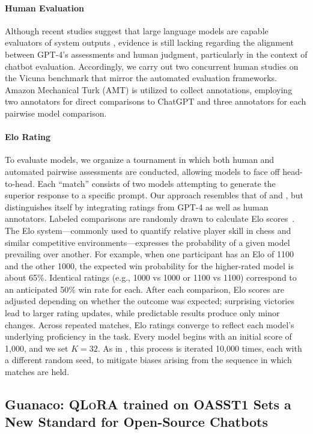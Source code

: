 \paragraph{Human Evaluation} Although recent studies suggest that large language models are capable evaluators of system outputs \citep{fu2023gptscore}, evidence is still lacking regarding the alignment between GPT-4’s assessments and human judgment, particularly in the context of chatbot evaluation. Accordingly, we carry out two concurrent human studies on the Vicuna benchmark that mirror the automated evaluation frameworks. Amazon Mechanical Turk (AMT) is utilized to collect annotations, employing two annotators for direct comparisons to ChatGPT and three annotators for each pairwise model comparison.

\paragraph{Elo Rating} To evaluate models, we organize a tournament in which both human and automated pairwise assessments are conducted, allowing models to face off head-to-head. Each “match” consists of two models attempting to generate the superior response to a specific prompt. Our approach resembles that of \citet{bai2022training} and \citet{vicuna2023}, but distinguishes itself by integrating ratings from GPT-4 as well as human annotators. Labeled comparisons are randomly drawn to calculate Elo scores~\citep{elo1967proposed,elo1978rating}. The Elo system—commonly used to quantify relative player skill in chess and similar competitive environments—expresses the probability of a given model prevailing over another. For example, when one participant has an Elo of 1100 and the other 1000, the expected win probability for the higher-rated model is about 65\%. Identical ratings (e.g., 1000 vs 1000 or 1100 vs 1100) correspond to an anticipated 50\% win rate for each. After each comparison, Elo scores are adjusted depending on whether the outcome was expected; surprising victories lead to larger rating updates, while predictable results produce only minor changes. Across repeated matches, Elo ratings converge to reflect each model’s underlying proficiency in the task. Every model begins with an initial score of 1,000, and we set $K=32$. As in \citet{vicuna2023}, this process is iterated 10,000 times, each with a different random seed, to mitigate biases arising from the sequence in which matches are held.

\subsection{\textbf{Guanaco}: \textsc{QLoRA} trained on OASST1 Sets a New Standard for Open-Source Chatbots}

